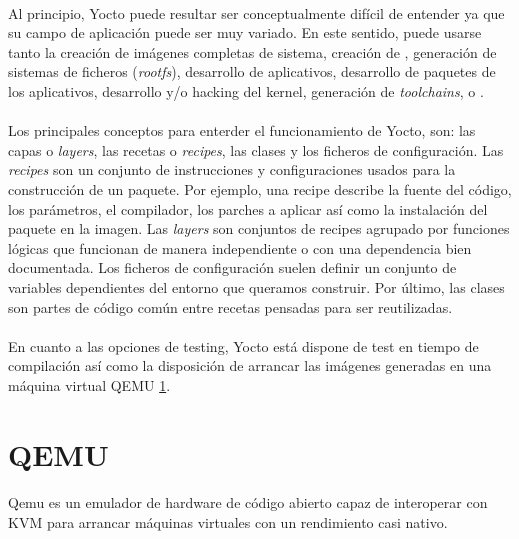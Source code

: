\paragraph{}Al principio, Yocto puede resultar ser conceptualmente difícil de entender
ya que su campo de aplicación puede ser muy variado. En este sentido, puede usarse tanto
la creación de imágenes completas de sistema, creación de \emph{}, generación
de sistemas de ficheros (\emph{rootfs}), desarrollo de aplicativos, desarrollo de paquetes
de los aplicativos, desarrollo y/o hacking del kernel, generación de  \emph{toolchains},
 o .

\paragraph{\label{layers} \label{recipes}}Los principales conceptos para enterder el
funcionamiento de Yocto, son:
las capas o \emph{layers}, las recetas o \emph{recipes}, las clases y los ficheros de
configuración. Las \emph{recipes} son un conjunto de instrucciones y configuraciones
usados para la construcción de un paquete. Por ejemplo, una recipe describe la fuente
del código, los parámetros, el compilador, los parches a aplicar así como la instalación
del paquete en la imagen. Las \emph{layers} son conjuntos de recipes agrupado por
funciones lógicas que funcionan de manera independiente o con una dependencia bien
documentada. Los ficheros de configuración suelen definir un conjunto de variables
dependientes del entorno que queramos construir. Por último, las clases son partes de
código común entre recetas pensadas para ser reutilizadas.

\paragraph{}En cuanto a las opciones de testing, Yocto está dispone de test en tiempo
de compilación así como la disposición de arrancar las imágenes generadas en una máquina
virtual QEMU \ref{sec:qemu}.

\section{QEMU}\label{sec:qemu}

\paragraph{}Qemu es un emulador de hardware de código abierto capaz de interoperar con
\gls{KVM} para arrancar máquinas virtuales con un rendimiento casi nativo.
\cite{qemu}

